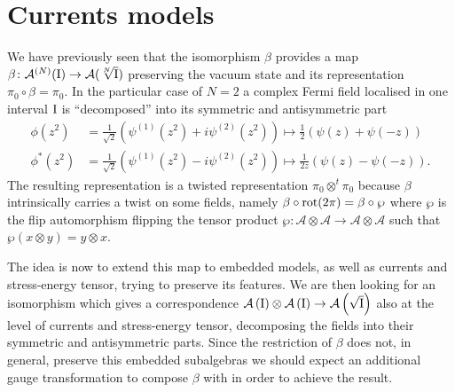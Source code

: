  
 \section{Currents models}
 \label{Currents models}
 We have previously seen that the isomorphism $\beta$ provides
 a map $\beta\colon\mathcal{A}^{(N)}(\textrm{I})\to
 \mathcal{A}(\sqrt[N]{\textrm{I}})$ preserving the vacuum state
 and its representation $\pi_0\circ\beta=\pi_0$. In
 the particular case of $N=2$ a complex Fermi field
 localised in one interval $\textrm{I}$ is ``decomposed'' into
 its symmetric and antisymmetric part
 \begin{align*}
 \phi(z^2)&=\frac{1}{\sqrt{2}}\left(\psi^{(1)}(z^2)
           +i\psi^{(2)}(z^2)\right)\mapsto\frac{1}{2}
           \left(\psi(z)+\psi(-z)\right)\\    
 \phi^*(z^2)&=\frac{1}{\sqrt{2}}\left(\psi^{(1)}(z^2)
           -i\psi^{(2)}(z^2)\right)\mapsto\frac{1}{2z}
           \left(\psi(z)-\psi(-z)\right).
 \end{align*}
 The resulting representation is a twisted 
 representation $\pi_0\otimes^t\pi_0$ 
 because $\beta$ intrinsically carries
 a twist on some fields, namely $\beta\circ\operatorname{rot}(2\pi)
 =\beta\circ\wp$ where $\wp$ is the flip automorphism
 flipping the tensor product $\wp\colon\mathcal{A}
 \otimes\mathcal{A}\to\mathcal{A}\otimes\mathcal{A}$ 
 such that $\wp(x\otimes y)=y\otimes x$.
 
 The idea is now to extend this map to embedded models,
 as well as currents and stress-energy tensor, trying to 
 preserve its features. We are then looking for an
 isomorphism which gives a correspondence
 $\mathcal{A}\left(\textrm{I}\right)\otimes\mathcal{A}\left(\textrm{I}\right)\to\mathcal{A}\left(\sqrt{\textrm{I}}\right)$
 also at the level of currents and stress-energy tensor,
 decomposing the fields into their symmetric and
 antisymmetric parts. Since the restriction of
 $\beta$ does not, in general, preserve this embedded
 subalgebras we should expect an additional gauge
 transformation to compose $\beta$ with in order to
 achieve the result.
 
